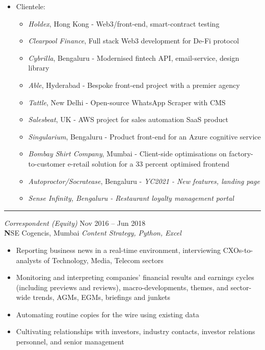 \documentclass[margin, 10pt]{res} %
\begin{document}
\begin{resume}
\begin{itemize}
\item Clientele:
\begin{itemize}
\item {\sl Holdex}, Hong Kong - Web3/front-end, smart-contract testing 
\item {\sl Clearpool Finance}, Full stack Web3 development for De-Fi protocol
\item {\sl Cybrilla}, Bengaluru - Modernised fintech API, email-service, design library
\item {\sl Able}, Hyderabad - Bespoke front-end project with a premier agency
\item {\sl Tattle}, New Delhi - Open-source WhatsApp Scraper with CMS
\item {\sl Salesbeat}, UK - AWS project for sales automation SaaS product
\item {\sl Singularium}, Bengaluru - Product front-end for an Azure cognitive service
\item {\sl Bombay Shirt Company}, Mumbai - Client-side optimisations on factory-to-customer e-retail solution for a 33 percent optimised frontend
\item {\sl Autoproctor/Socratease}, Bengaluru - \sl YC2021 - New features, landing page
\item {\sl Sense Infinity, Bengaluru - Restaurant loyalty management portal}
\end{itemize}
\end{itemize}
\par\noindent\rule{\textwidth}{0.1pt}

{\sl Correspondent (Equity)} \hfill Nov 2016 – Jun 2018 \\
\textbf NSE Cogencis, Mumbai \hfill {\scriptsize \it Content Strategy, Python, Excel}
\begin{itemize}\smallskip\smallskip
\item Reporting business news in a real-time environment, interviewing CXOs-to-analysts of Technology, Media, Telecom sectors
\item Monitoring and interpreting companies’ financial results and earnings cycles (including previews and reviews), macro-developments, themes, and sector-wide trends, AGMs, EGMs, briefings and junkets
\item Automating routine copies for the wire using existing data
\item Cultivating relationships with investors, industry contacts, investor relations personnel, and senior management

\end{itemize}


\end{resume}
\end{document}

